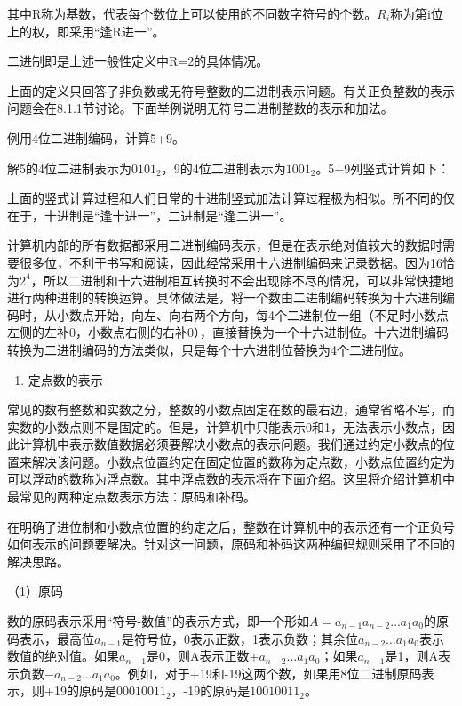 \documentclass[]{ctexbook}
\providecommand{\tightlist}{%
  \setlength{\itemsep}{0pt}\setlength{\parskip}{0pt}}
\begin{document}
其中R称为基数，代表每个数位上可以使用的不同数字符号的个数。\(R_{i}\)称为第i位上的权，即采用``逢R进一''。

二进制即是上述一般性定义中R=2的具体情况。

上面的定义只回答了非负数或无符号整数的二进制表示问题。有关正负整数的表示问题会在8.1.1节讨论。下面举例说明无符号二进制整数的表示和加法。

例用4位二进制编码，计算5+9。

解5的4位二进制表示为\(0101_{2}\)，9的4位二进制表示为\(1001_{2}\)。5+9列竖式计算如下：

上面的竖式计算过程和人们日常的十进制竖式加法计算过程极为相似。所不同的仅在于，十进制是``逢十进一''，二进制是``逢二进一''。

计算机内部的所有数据都采用二进制编码表示，但是在表示绝对值较大的数据时需要很多位，不利于书写和阅读，因此经常采用十六进制编码来记录数据。因为16恰为\(2^4\)，所以二进制和十六进制相互转换时不会出现除不尽的情况，可以非常快捷地进行两种进制的转换运算。具体做法是，将一个数由二进制编码转换为十六进制编码时，从小数点开始，向左、向右两个方向，每4个二进制位一组（不足时小数点左侧的左补0，小数点右侧的右补0），直接替换为一个十六进制位。十六进制编码转换为二进制编码的方法类似，只是每个十六进制位替换为4个二进制位。

\begin{enumerate}
\def\labelenumi{\arabic{enumi}.}
\setcounter{enumi}{1}
\tightlist
\item
  定点数的表示
\end{enumerate}

常见的数有整数和实数之分，整数的小数点固定在数的最右边，通常省略不写，而实数的小数点则不是固定的。但是，计算机中只能表示0和1，无法表示小数点，因此计算机中表示数值数据必须要解决小数点的表示问题。我们通过约定小数点的位置来解决该问题。小数点位置约定在固定位置的数称为定点数，小数点位置约定为可以浮动的数称为浮点数。其中浮点数的表示将在下面介绍。这里将介绍计算机中最常见的两种定点数表示方法：原码和补码。

在明确了进位制和小数点位置的约定之后，整数在计算机中的表示还有一个正负号如何表示的问题要解决。针对这一问题，原码和补码这两种编码规则采用了不同的解决思路。

（1）原码

数的原码表示采用``符号-数值''的表示方式，即一个形如\(A=a_{n-1}a_{n-2}\ldots a_{1}a_{0}\)的原码表示，最高位\(a_{n-1}\)是符号位，0表示正数，1表示负数；其余位\(a_{n-2}\ldots a_{1}a_{0}\)表示数值的绝对值。如果\(a_{n-1}\)是0，则A表示正数\(+a_{n-2}\ldots a_{1}a_{0}\)；如果\(a_{n-1}\)是1，则A表示负数\(-a_{n-2}\ldots a_{1}a_{0}\)。例如，对于+19和-19这两个数，如果用8位二进制原码表示，则+19的原码是\(00010011_{2}\)，-19的原码是\(10010011_{2}\)。
\end{document}
